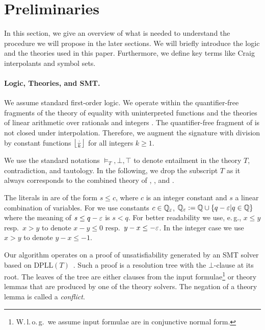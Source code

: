 \section{Preliminaries}

\begin{techreport}
In this section, we give an overview of what is needed to understand the
procedure we will propose in the later sections. We will briefly introduce the
logic and the theories used in this paper.
Furthermore, we define key terms like Craig interpolants and symbol sets.
\end{techreport}

\paragraph*{Logic, Theories, and SMT.}
We assume standard first-order logic. We operate within
the quantifier-free fragments of the theory of equality with uninterpreted
functions \euf and the theories of linear arithmetic over rationals \laq
and integers \laz.
The quantifier-free fragment of \laz is not closed under
interpolation.  Therefore, we augment the signature with
division by constant functions $\left\lfloor \frac{\cdot}{k} \right\rfloor$ for all integers $k\geq 1$.

We use the standard notations $\models_T, \bot, \top$ to denote
entailment in the theory $T$, contradiction, and tautology.  In the
following, we drop the subscript $T$ as it always corresponds to the combined
theory of \euf, \laq, and \laz.

The literals in \laz are of the form $s \leq c$, where $c$ is an
integer constant and $s$ a linear combination of variables.  For \laq
we use constants $c \in \mathbb{Q}_\varepsilon$, 
$\mathbb{Q}_\varepsilon := \mathbb{Q} \cup \{q - \varepsilon | q\in
\mathbb{Q}\}$ where the meaning of $s \leq q-\varepsilon$ is $s < q$.  For
better readability we use, e.\,g., $x \leq y$ resp.\ $x > y$ to denote
$x-y\leq 0$ resp.\ $y-x \leq -\varepsilon$.  In the integer case we use $x > y$ 
to denote $y-x \leq -1$.

Our algorithm operates on a proof of unsatisfiability generated
by an SMT solver based on DPLL$(T)$~\cite{dpllt}.
Such a proof is a resolution tree with the
$\bot$-clause at its root. The leaves of the tree are either clauses
from the input formulae\footnote{W.\,l.\,o.\,g.\ we assume input formulae are
  in conjunctive normal form.} or theory lemmas that are produced by one of
the theory solvers. The negation of a theory lemma is called a
\emph{conflict}.

